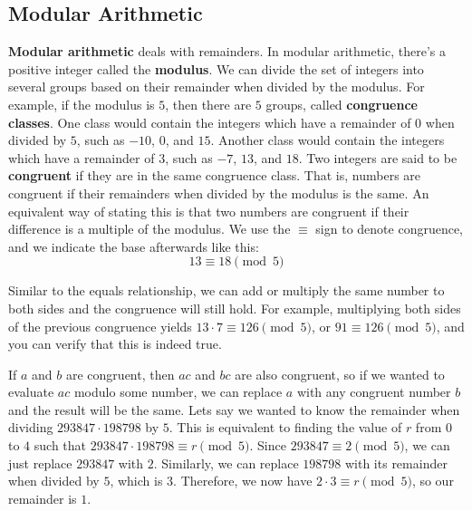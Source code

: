 \documentclass{article}
\begin{document}
\begin{multicols}{2}
	\section*{Modular Arithmetic}
	\textbf{Modular arithmetic} deals with remainders.
	In modular arithmetic, there's a positive integer called the \textbf{modulus}.
	We can divide the set of integers into several groups based on their remainder when divided by the modulus.
	For example, if the modulus is $5$, then there are $5$ groups, called \textbf{congruence classes}.
	One class would contain the integers which have a remainder of $0$ when divided by $5$, such as $-10$, $0$, and $15$.
	Another class would contain the integers which have a remainder of $3$, such as $-7$, $13$, and $18$.
	Two integers are said to be \textbf{congruent} if they are in the same congruence class.
	That is, numbers are congruent if their remainders when divided by the modulus is the same.
	An equivalent way of stating this is that two numbers are congruent if their difference is a multiple of the modulus.
	We use the $\equiv$ sign to denote congruence, and we indicate the base afterwards like this:
	\[
		13 \equiv 18 \pmod{5}
	\]


	Similar to the equals relationship, we can add or multiply the same number to both sides and the congruence will still hold.
	For example, multiplying both sides of the previous congruence yields $13 \cdot 7 \equiv 126 \pmod{5}$, or $91 \equiv 126 \pmod{5}$, and you can verify that this is indeed true.
	
	If $a$ and $b$ are congruent, then $ac$ and $bc$ are also congruent, so if we wanted to evaluate $ac$ modulo some number, we can replace $a$ with any congruent number $b$ and the result will be the same.
	Lets say we wanted to know the remainder when dividing $293847 \cdot 198798$ by $5$.
	This is equivalent to finding the value of $r$ from $0$ to $4$ such that $293847 \cdot 198798 \equiv r \pmod{5}$.
	Since $293847 \equiv 2 \pmod{5}$, we can just replace $293847$ with $2$.
	Similarly, we can replace $198798$ with its remainder when divided by $5$, which is $3$.
	Therefore, we now have $2 \cdot 3 \equiv r \pmod{5}$, so our remainder is $1$.
\end{multicols}
\end{document}
